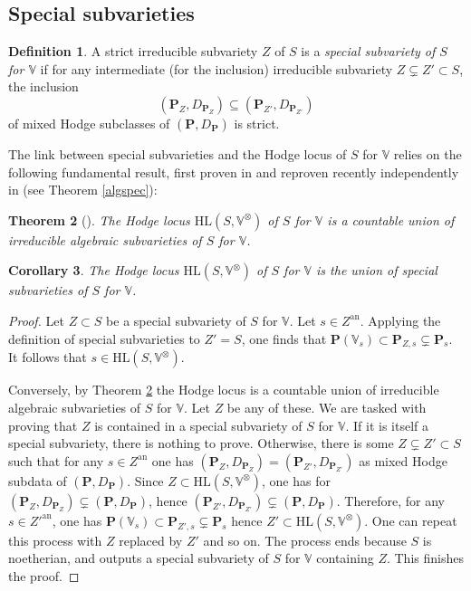 \documentclass[10pt]{article}
\numberwithin{equation}{subsection}
\theoremstyle{plain}
\newtheorem{theorem}{Theorem}[section]
\newtheorem{corollary}[theorem]{Corollary}
\theoremstyle{definition}
\newtheorem{definition}[theorem]{Definition}
\newtheorem{remark}[theorem]{Remark}
\theoremstyle{remark}
\newcommand{\V}{\mathbb V}
\newcommand{\pp}{\mathbf P}
\newcommand{\HL}{\mathrm{HL}(S, \V^\otimes)}
\newcommand{\an}{\mathrm{an}}
\begin{document}
\subsection{Special subvarieties}
\begin{definition}
A strict irreducible subvariety $Z$ of $S$ is a \textit{special subvariety of $S$ for $\V$} if for any intermediate (for the inclusion) irreducible subvariety $Z \subsetneq Z' \subset S$, the inclusion
\[
(\pp_Z, D_{\pp_Z}) \subseteq (\pp_{Z'}, D_{\pp_{Z'}})
\]
of mixed Hodge subclasses of $(\pp, D_\pp)$ is strict.
\end{definition}
The link between special subvarieties and the Hodge locus of $S$ for $\V$ relies on the following fundamental result, first proven in \cite{bps} and reproven recently independently in \cite{bbkt} (see Theorem \ref{algspec}):
\begin{theorem}[{\cite[Thm. 1]{bps}}]\label{bps}
The Hodge locus $\HL$ of $S$ for $\V$ is a countable union of irreducible algebraic subvarieties of $S$ for $\V$.
\end{theorem}
\begin{corollary}
The Hodge locus $\HL$ of $S$ for $\V$ is the union of special subvarieties of $S$ for $\V$.
\end{corollary}
\begin{proof}
Let $Z \subset S$ be a special subvariety of $S$ for $\V$. Let $s \in Z^\an$. Applying the definition of special subvarieties to $Z' = S$, one finds that $\pp(\V_s) \subset \pp_{Z,s} \subsetneq \pp_s$. It follows that $s \in \HL$.

Conversely, by Theorem \ref{bps} the Hodge locus is a countable union of irreducible algebraic subvarieties of $S$ for $\V$. Let $Z$ be any of these. We are tasked with proving that $Z$ is contained in a special subvariety of $S$ for $\V$. If it is itself a special subvariety, there is nothing to prove. Otherwise, there is some $Z \subsetneq Z' \subset S$ such that for any $s \in Z^\an$ one has $(\pp_{Z}, D_{\pp_Z}) = (\pp_{Z'}, D_{\pp_{Z'}})$ as mixed Hodge subdata of $(\pp, D_\pp)$. Since $Z \subset \HL$, one has for $(\pp_{Z}, D_{\pp_Z}) \subsetneq (\pp, D_\pp)$, hence $(\pp_{Z'}, D_{\pp_{Z'}}) \subsetneq (\pp, D_\pp)$. Therefore, for any $s \in Z'^\an$, one has $\pp(\V_s) \subset \pp_{Z',s} \subsetneq \pp_s$ hence $Z' \subset \HL$. One can repeat this process with $Z$ replaced by $Z'$ and so on. The process ends because $S$ is noetherian, and outputs a special subvariety of $S$ for $\V$ containing $Z$. This finishes the proof.
\end{proof}
\end{document}
